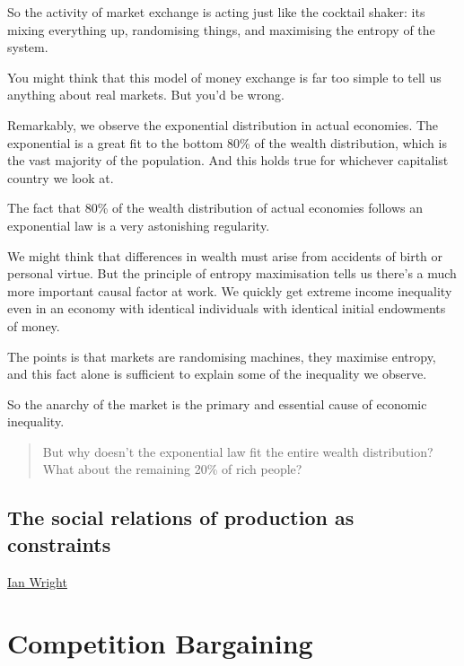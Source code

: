 \documentclass[
]{book}
\begin{document}
So the activity of market exchange is acting just like the cocktail shaker: its mixing everything up, randomising things, and maximising the entropy of the system.

You might think that this model of money exchange is far too simple to tell us anything about real markets. But you'd be wrong.

Remarkably, we observe the exponential distribution in actual economies. The exponential is a great fit to the bottom 80\% of the wealth distribution, which is the vast majority of the population. And this holds true for whichever capitalist country we look at.

The fact that 80\% of the wealth distribution of actual economies follows an exponential law is a very astonishing regularity.

We might think that differences in wealth must arise from accidents of birth or personal virtue. But the principle of entropy maximisation tells us there's a much more important causal factor at work. We quickly get extreme income inequality even in an economy with identical individuals with identical initial endowments of money.

The points is that markets are randomising machines, they maximise entropy, and this fact alone is sufficient to explain some of the inequality we observe.

So the anarchy of the market is the primary and essential cause of economic inequality.

\begin{quote}
But why doesn't the exponential law fit the entire wealth distribution?
What about the remaining 20\% of rich people?
\end{quote}

\hypertarget{the-social-relations-of-production-as-constraints}{%
\subsection{The social relations of production as constraints}\label{the-social-relations-of-production-as-constraints}}

\href{https://ianwrightsite.wordpress.com/2017/11/16/the-social-architecture-of-capitalism/}{Ian Wright}

\hypertarget{competition-bargaining}{%
\section{Competition Bargaining}\label{competition-bargaining}}
\end{document}
